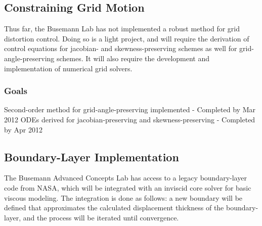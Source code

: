 \documentclass[12pt,letterpaper]{article}
\begin{document}
\subsection{Constraining Grid Motion}
Thus far, the Busemann Lab has not implemented a robust method for
grid distortion control. Doing so is a light project, and will require
the derivation of control equations for jacobian- and
skewness-preserving schemes as well for grid-angle-preserving
schemes. It will also require the development and implementation of 
numerical grid solvers.

\subsubsection{Goals}
Second-order method for grid-angle-preserving implemented - Completed by
Mar 2012
ODEs derived for jacobian-preserving and skewness-preserving -
Completed by
Apr 2012
\subsection{Boundary-Layer Implementation}
The Busemann Advanced Concepts Lab has access to a legacy
boundary-layer code from NASA, which will be integrated with an
inviscid core solver for basic viscous modeling. The integration is
done as follows: a new boundary will be defined that approximates the
calculated displacement thickness of the boundary-layer, and the
process will be iterated until convergence. 
\end{document}
